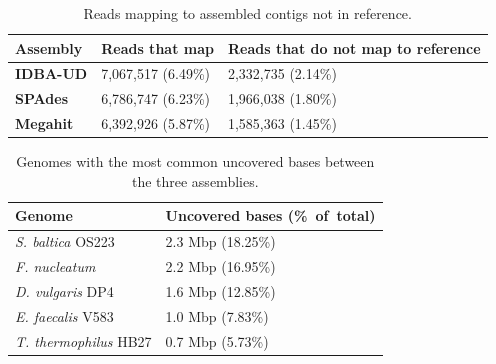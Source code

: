 \documentclass[10pt,a4paper,twocolumn]{article}
\begin{document}
\begin{table}[!ht]
\caption{Reads mapping to assembled contigs not in reference.}
\centering
\begin{tabular}{|p{2cm}|p{2.5cm}|p{2.5cm}|} 
\hline

\textbf{Assembly}& \textbf{Reads that map} &  \textbf{Reads that do not map to reference}    \\ [0.5ex] %
\hline
\textbf{IDBA-UD}&7,067,517 (6.49\%) &2,332,735 (2.14\%)\\
\hline
\textbf{SPAdes}&6,786,747 (6.23\%)&1,966,038 (1.80\%)  \\
\hline
\textbf{Megahit}&6,392,926 (5.87\%)&1,585,363 (1.45\%)  \\
\hline
\end{tabular}
\label{table:read-mapping} 
\end{table}
\begin{table}[!h]
 \centering
 \caption{Genomes with the most common uncovered bases between the three assemblies.}
 \begin{tabular}{|p{4.50cm}|p{2.75cm}|} \hline
\textbf{Genome} & \textbf{Uncovered bases (\%~of~total)} \\ \hline 
{\em S. baltica} OS223 & 2.3 Mbp (18.25\%) \\ \hline
{\em F. nucleatum} & 2.2 Mbp (16.95\%) \\ \hline
{\em D. vulgaris} DP4 & 1.6 Mbp (12.85\%) \\ \hline
{\em E. faecalis} V583 & 1.0 Mbp (7.83\%) \\ \hline
{\em T. thermophilus} HB27 & 0.7 Mbp (5.73\%) \\ \hline
\end{tabular}
\label{table:genomes_uncovered}
\end{table}

\end{document}
